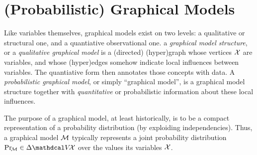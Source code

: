 



\section{(Probabilistic) Graphical Models}

Like variables themselves, graphical models exist on two levels: a qualitative or structural one, and a quantiative observational one.
%
a \emph{graphical model structure}, or a \emph{qualitative graphical model} is a (directed) (hyper)graph whose vertices $\mathcal X$ are variables, and whose (hyper)edges somehow indicate local influences between variables.
The quantiative form then annotates those concepts with data.
A \emph{probabilistic graphical model},
or simply  ``graphical model'', is a
graphical model structure together with  \emph{quantitative} or probabilistic information about these local influences.

The purpose of a graphical model, at least historically, is to be a compact representation of a probability distribution (by exploiding independencies). 
Thus, a graphical model $\cal M$
typically represents a joint probability distribution $\Pr_{\!\cal M}
 \in \Delta \V\!\X$ over the values its variables $\mathcal X$.

